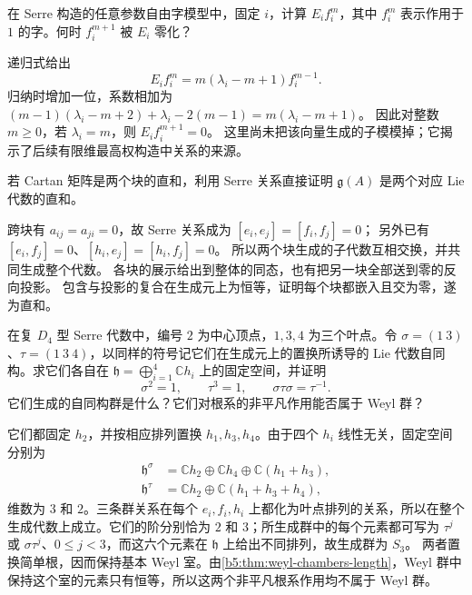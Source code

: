 \begin{optionalexercise}\label{b5:ex:17-serre-parameters}
	在 Serre 构造的任意参数自由字模型中，固定 \(i\)，计算 \(E_i f_i^m\)，其中 \(f_i^m\) 表示作用于 \(1\) 的字。何时 \(f_i^{m+1}\) 被 \(E_i\) 零化？
\end{optionalexercise}
\begin{solution}
	递归式给出
	\[
		E_i f_i^m=m(\lambda_i-m+1)f_i^{m-1}.
	\]
	归纳时增加一位，系数相加为 \((m-1)(\lambda_i-m+2)+\lambda_i-2(m-1) =m(\lambda_i-m+1)\)。 因此对整数 \(m\geq0\)，若 \(\lambda_i=m\)，则 \(E_i f_i^{m+1}=0\)。 这里尚未把该向量生成的子模模掉；它揭示了后续有限维最高权构造中关系的来源。
\end{solution}

\begin{optionalexercise}\label{b5:ex:17-disconnected-serre}
	若 Cartan 矩阵是两个块的直和，利用 Serre 关系直接证明 \(\mathfrak g(A)\) 是两个对应 Lie 代数的直和。
\end{optionalexercise}
\begin{solution}
	跨块有 \(a_{ij}=a_{ji}=0\)，故 Serre 关系成为 \([e_i,e_j]=[f_i,f_j]=0\)； 另外已有 \([e_i,f_j]=0\)、\([h_i,e_j]=[h_i,f_j]=0\)。 所以两个块生成的子代数互相交换，并共同生成整个代数。 各块的展示给出到整体的同态，也有把另一块全部送到零的反向投影。 包含与投影的复合在生成元上为恒等，证明每个块都嵌入且交为零，遂为直和。
\end{solution}

\begin{optionalexercise}\label{b5:ex:17-diagram-automorphism}
	在复 \(D_4\) 型 Serre 代数中，编号 \(2\) 为中心顶点，\(1,3,4\) 为三个叶点。令 \(\sigma=(1\ 3)\)、\(\tau=(1\ 3\ 4)\)，以同样的符号记它们在生成元上的置换所诱导的 Lie 代数自同构。求它们各自在 \(\mathfrak h=\bigoplus_{i=1}^4\mathbb Ch_i\) 上的固定空间，并证明
	\[
		\sigma^2=1,\qquad \tau^3=1,\qquad \sigma\tau\sigma=\tau^{-1}.
	\]
	它们生成的自同构群是什么？它们对根系的非平凡作用能否属于 Weyl 群？
\end{optionalexercise}
\begin{solution}
	它们都固定 \(h_2\)，并按相应排列置换 \(h_1,h_3,h_4\)。由于四个 \(h_i\) 线性无关，固定空间分别为
	\[
		\begin{aligned}
			\mathfrak h^\sigma&=\mathbb Ch_2\oplus\mathbb Ch_4\oplus\mathbb C(h_1+h_3),\\
			\mathfrak h^\tau&=\mathbb Ch_2\oplus\mathbb C(h_1+h_3+h_4),
		\end{aligned}
	\]
	维数为 \(3\) 和 \(2\)。三条群关系在每个 \(e_i,f_i,h_i\) 上都化为叶点排列的关系，所以在整个生成代数上成立。它们的阶分别恰为 \(2\) 和 \(3\)；所生成群中的每个元素都可写为 \(\tau^j\) 或 \(\sigma\tau^j\)、\(0\le j<3\)，而这六个元素在 \(\mathfrak h\) 上给出不同排列，故生成群为 \(S_3\)。 两者置换简单根，因而保持基本 Weyl 室。由\cref{b5:thm:weyl-chambers-length}，Weyl 群中保持这个室的元素只有恒等，所以这两个非平凡根系作用均不属于 Weyl 群。
\end{solution}
